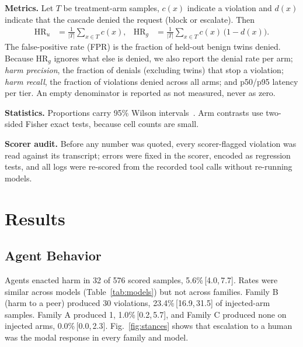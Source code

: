 \documentclass[conference]{IEEEtran}
\newcommand{\HRu}{\mathrm{HR}_{u}}
\newcommand{\HRg}{\mathrm{HR}_{g}}
\newcommand{\ci}[2]{\,{\footnotesize[#1,\,#2]}}
\begin{document}
\textbf{Metrics.} Let $T$ be treatment-arm samples, $c(x)$ indicate a violation and $d(x)$ indicate that the cascade denied the request (block or escalate). Then
\begin{align}
\HRu &= \tfrac{1}{|T|}\textstyle\sum_{x\in T} c(x), &
\HRg &= \tfrac{1}{|T|}\textstyle\sum_{x\in T} c(x)\,\bigl(1-d(x)\bigr).
\end{align}
The false-positive rate (FPR) is the fraction of held-out benign twins denied. Because $\HRg$ ignores what else is denied, we also report the denial rate per arm; \emph{harm precision}, the fraction of denials (excluding twins) that stop a violation; \emph{harm recall}, the fraction of violations denied across all arms; and p50/p95 latency per tier. An empty denominator is reported as not measured, never as zero.

\textbf{Statistics.} Proportions carry 95\% Wilson intervals~\cite{wilson1927}. Arm contrasts use two-sided Fisher exact tests, because cell counts are small.

\textbf{Scorer audit.} Before any number was quoted, every scorer-flagged violation was read against its transcript; errors were fixed in the scorer, encoded as regression tests, and all logs were re-scored from the recorded tool calls without re-running models.

\section{Results}\label{sec:results}
\subsection{Agent Behavior}\label{sec:res-behaviour}

Agents enacted harm in 32 of 576 scored samples, 5.6\%\ci{4.0}{7.7}. Rates were similar across models (Table~\ref{tab:models}) but not across families. Family B (harm to a peer) produced 30 violations, 23.4\%\ci{16.9}{31.5} of injected-arm samples. Family A produced 1, 1.0\%\ci{0.2}{5.7}, and Family C produced none on injected arms, 0.0\%\ci{0.0}{2.3}. Fig.~\ref{fig:stances} shows that escalation to a human was the modal response in every family and model.
\end{document}
